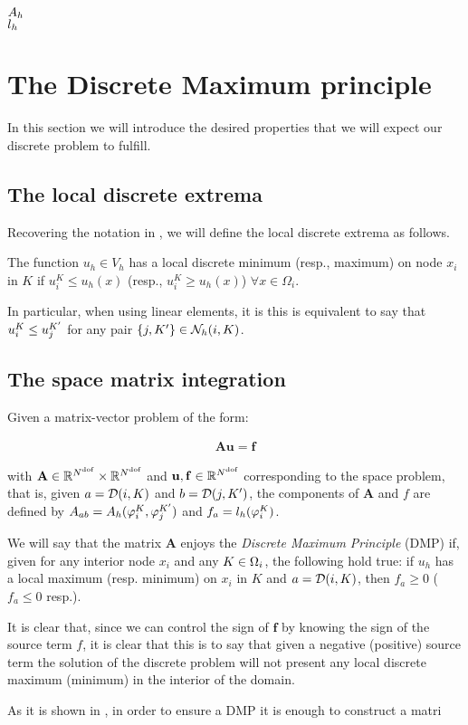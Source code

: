 $A_h$\\
$l_h$

\section{The Discrete Maximum principle}

In this section we will introduce the desired properties that we will expect our discrete problem to fulfill.

\subsection{The local discrete extrema}

Recovering the notation in \cite{badia_discrete_2015}, we will define the local discrete extrema as follows.

 \begin{definition}
 	The function $u_h\in V_h$ has a local discrete minimum (resp., maximum)  on node $x_i$ in $K$ if $u_i^K \leq u_h(x)$ (resp., $u_i^K \geq u_h(x)$) $\forall x\in \Omega_i$.
 \end{definition}
 
 In particular, when using linear elements, it is this is equivalent to say that $u_i^K\leq u_j^{K'}$ for any pair $\{j,{K'}\}\in \mathcal{N}_h(i,K) $.

\subsection{The space matrix integration}

Given a matrix-vector problem of the form:

\begin{align*}
 \mathbf{Au} = \mathbf{f}
\end{align*}

with $ \mathbf{A}\in \mathbb{R}^{N^{\rm dof}}\times\mathbb{R}^{N^{\rm dof}}$ and $ \mathbf{u}, \mathbf{f}\in\mathbb{R}^{N^{\rm dof}}$ corresponding to the space problem, that is, given $a=\mathcal{D}(i,K)$ and $b=\mathcal{D}(j,{K'})$, the components of $ \mathbf{A}$ and $f$ are defined by $A_{ab}=A_h(\varphi_{i}^{K},\varphi_{j}^{{K'}})$ and $f_a=l_h(\varphi_{i}^{K})$. 

\begin{definition}
	We will say that the matrix $ \mathbf{A}$ enjoys the \textit{Discrete Maximum Principle} (DMP) if, given for any interior node $x_i$ and any $K\in\Omega_i$, the following hold true: if $u_h$ has a local maximum (resp. minimum) on $x_i$ in $K$ and $a=\mathcal{D}(i,K)$, then $f_a \geq 0$ ($f_a\leq0$ resp.).
\end{definition}

It is clear that, since we can control the sign of $ \mathbf{f}$ by knowing the sign of the source term $f$, it is clear that this is to say that given a negative (positive) source term the solution of the discrete problem will not present any local discrete maximum (minimum) in the interior of the domain.


As it is shown in \cite{Jesus}, in order to ensure a DMP it is enough to construct a matri




